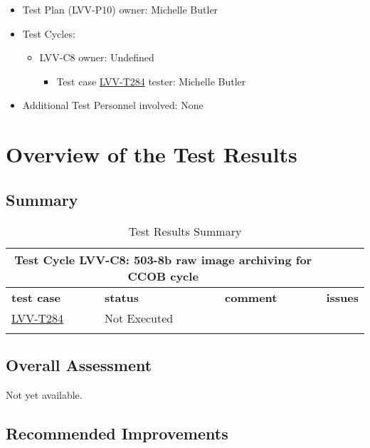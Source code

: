 \documentclass[DM,lsstdraft,STR,toc]{lsstdoc}
\begin{document}
\begin{itemize}
\item Test Plan (LVV-P10) owner: Michelle Butler
\item Test Cycles:
\begin{itemize}
  \item LVV-C8 owner: 
    Undefined
  \begin{itemize}
    \item Test case \href{https://jira.lsstcorp.org/secure/Tests.jspa#/testCase/LVV-T284}{LVV-T284} tester: Michelle Butler
  \end{itemize}
\end{itemize}
\item Additional Test Personnel involved: None
\end{itemize}

\newpage

\section{Overview of the Test Results}
\label{sect:overview}

\subsection{Summary}
\label{sect:summarytable}

\begin{longtable}{p{}p{}p{}p{}}
\toprule
  \multicolumn{3}{c}{ Test Cycle {\bf LVV-C8: 503-8b raw image archiving for CCOB cycle
 }} \\\hline
  {\bf \footnotesize test case} & {\bf \footnotesize status} & {\bf \footnotesize comment} & {\bf \footnotesize issues} \\\toprule
    \href{https://jira.lsstcorp.org/secure/Tests.jspa#/testCase/LVV-T284}{LVV-T284} 
    & Not Executed & 
 &
    \\\hline

\caption{Test Results Summary}
\label{table:summary}
\end{longtable}

\subsection{Overall Assessment}
\label{sect:overallassessment}

Not yet available.

\subsection{Recommended Improvements}
\label{sect:recommendations}
\end{document}
